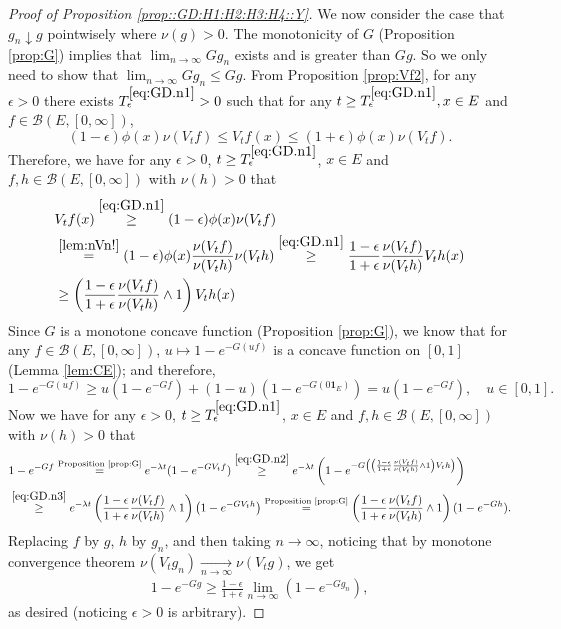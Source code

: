 \documentclass[12pt,a4paper]{amsart}
\numberwithin{equation}{section}
\theoremstyle{plain}
\theoremstyle{definition}
\theoremstyle{remark}
\begin{document}
\begin{proof}[Proof of Proposition \ref{prop::GD:H1:H2:H3:H4::Y}]
	We now consider the case that $g_n \downarrow g$ pointwisely 
	where $\nu(g) > 0$. 
	The monotonicity of $G$ (Proposition \ref{prop:G}) implies that $\lim_{n \to \infty} Gg_n$ exists and is greater 
	than $G g$.
	So we only need to show that $\lim_{n\to \infty} Gg_n \leq Gg$.
	From Proposition \ref{prop:Vf2}, for any $\epsilon>0$ there exists $T_\epsilon^{\eqref{eq:GD.n1}} >0$ such that for any $t\geq T_\epsilon^{\eqref{eq:GD.n1}}, x\in E$ and $f\in \mathcal B(E,[0,\infty])$,
\begin{equation} \label{eq:GD.n1}
	(1-\epsilon)\phi(x) \nu(V_tf)\leq V_tf(x)
	\leq (1+\epsilon)\phi(x) \nu(V_tf).
\end{equation}
	Therefore, we have for any $\epsilon>0$, $t \geq T_\epsilon^{\eqref{eq:GD.n1}}$, $x\in E$ and $f, h\in \mathcal B(E,[0,\infty])$ with $\nu(h) >0$ that
\begin{align}
	&V_tf(x)
	\overset{\eqref{eq:GD.n1}}\geq (1-\epsilon)\phi(x) \nu(V_tf)
	\\& \overset{\eqref{lem:nVn!}}= (1-\epsilon)\phi(x) \frac{\nu(V_tf)}{\nu(V_th)} \nu(V_th)
\overset{\eqref{eq:GD.n1}}\geq \frac{1-\epsilon}{1+\epsilon} \frac{\nu(V_tf)}{\nu(V_th)} V_th(x)
	\\ \label{eq:GD.n2} & \geq \left(\frac{1-\epsilon}{1+\epsilon} \frac{\nu(V_tf)}{\nu(V_th)} \wedge 1\right) V_th(x)
\end{align}
	Since $G$ is a monotone concave function (Proposition \ref{prop:G}), we know that for any $f\in \mathcal B(E,[0,\infty])$, $u \mapsto 1 - e^{-G(uf)}$ is a concave function on $[0,1]$ (Lemma \ref{lem:CE}); and therefore,
\begin{equation} \label{eq:GD.n3}
	1 - e^{- G(uf)}\geq u(1- e^{- Gf}) + (1-u) (1- e^{- G(0  \mathbf 1_E)}) = u(1- e^{- Gf}), \quad u \in [0,1].
\end{equation}
	Now we have for any $\epsilon>0$, $t \geq T_\epsilon^{\eqref{eq:GD.n1}}$, $x\in E$ and $f, h\in \mathcal B(E,[0,\infty])$ with $\nu(h) >0$ that
\begin{align}
	&1 - e^{-Gf}
	\overset{\text{Proposition \ref{prop:G}}}= e^{-\lambda t}(1- e^{- GV_t f})
	\overset{\eqref{eq:GD.n2}}\geq e^{-\lambda t}\left(1- e^{- G\left( \left(\frac{1-\epsilon}{1+\epsilon} \frac{\nu(V_tf)}{\nu(V_th)} \wedge 1\right) V_th\right) }\right)
	\\ &\overset{\eqref{eq:GD.n3}}\geq e^{-\lambda t} \left(\frac{1-\epsilon}{1+\epsilon} \frac{\nu(V_tf)}{\nu(V_th)} \wedge 1 \right) \left(1- e^{- GV_th }\right)
	\overset{\text{Proposition \ref{prop:G}}}= \left(\frac{1-\epsilon}{1+\epsilon} \frac{\nu(V_tf)}{\nu(V_th)} \wedge 1\right) (1 - e^{- Gh}).
\end{align}
	Replacing $f$ by $g$, $h$ by $g_n$, and then taking $n\to \infty$, noticing that by monotone convergence theorem $\nu(V_tg_n) \xrightarrow[n\to \infty]{} \nu(V_tg)$, we get
\begin{align}
	1 - e^{- Gg} \geq \frac{1 - \epsilon}{1+\epsilon}\lim_{n\to \infty}(1 - e^{- Gg_n}),
\end{align}
	as desired (noticing $\epsilon > 0$ is arbitrary).
\end{proof}
\end{document}
